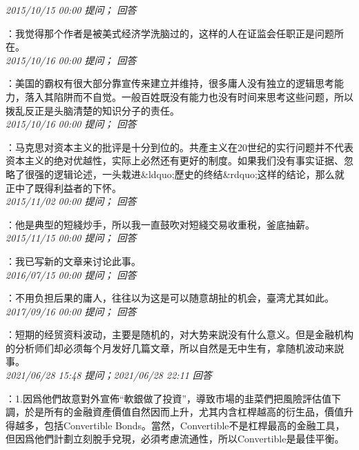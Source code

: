 \documentclass[twocolumn]{ctexart}
\begin{document}
\textit{\hfill\noindent\small 2015/10/15 00:00 提问； 回答}

：我觉得那个作者是被美式经济学洗脑过的，这样的人在证监会任职正是问题所在。\\

\textit{\hfill\noindent\small 2015/10/16 00:00 提问； 回答}

：美国的霸权有很大部分靠宣传来建立并维持，很多庸人没有独立的逻辑思考能力，落入其陷阱而不自觉。一般百姓既没有能力也没有时间来思考这些问题，所以拨乱反正是头脑清楚的知识分子的责任。\\

\textit{\hfill\noindent\small 2015/10/16 00:00 提问； 回答}

：马克思对资本主义的批评是十分到位的。共產主义在20世纪的实行问题并不代表资本主义的绝对优越性，实际上必然还有更好的制度。如果我们没有事实证据、忽略了很强的逻辑论述，一头栽进\&ldquo;歷史的终结\&rdquo;这样的结论，那么就正中了既得利益者的下怀。\\

\textit{\hfill\noindent\small 2015/11/02 00:00 提问； 回答}

：他是典型的短綫炒手，所以我一直鼓吹对短綫交易收重税，釜底抽薪。\\

\textit{\hfill\noindent\small 2015/11/15 00:00 提问； 回答}

：我已写新的文章来讨论此事。\\

\textit{\hfill\noindent\small 2016/07/15 00:00 提问； 回答}

：不用负担后果的庸人，往往以为这是可以随意胡扯的机会，臺湾尤其如此。\\

\textit{\hfill\noindent\small 2017/09/16 00:00 提问； 回答}

：短期的经贸资料波动，主要是随机的，对大势来説没有什么意义。但是金融机构的分析师们却必须每个月发好几篇文章，所以自然是无中生有，拿随机波动来説事。\\

\textit{\hfill\noindent\small 2021/06/28 15:48 提问；2021/06/28 22:11 回答}

：1.因爲他們故意對外宣佈“軟銀做了投資”，導致市場的韭菜們把風險評估值下調，於是所有的金融資產價值自然因而上升，尤其内含杠桿越高的衍生品，價值升得越多，包括Convertible Bonds。當然，Convertible不是杠桿最高的金融工具，但因爲他們計劃立刻脫手兌現，必須考慮流通性，所以Convertible是最佳平衡。
\end{document}
